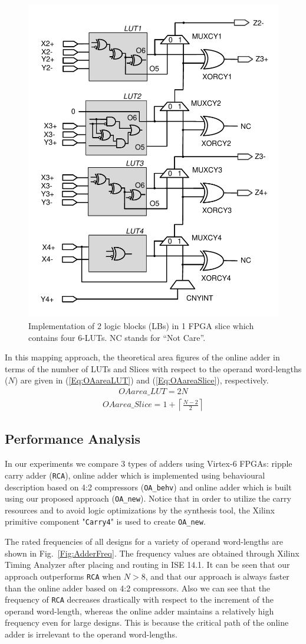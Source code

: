 \documentclass[conference]{IEEEtran}
\begin{document}
\begin{figure}[tbp]
	\centering
	\includegraphics[width=.5\textwidth]{./Figures/SDadder_FastCarry_New.pdf}
	\caption{Implementation of 2 logic blocks (LBs) in 1 FPGA slice which contains four 6-LUTs. NC stands for ``Not Care''.}
	\label{Fig:SliceNew}
\end{figure}

In this mapping approach, the theoretical area figures of the online adder in terms of the number of LUTs and Slices with respect to the operand word-lengths ($N$) are given in (\ref{Eq:OAareaLUT}) and (\ref{Eq:OAareaSlice}), respectively.
\begin{eqnarray}\label{Eq:OAareaLUT}
	OAarea\_LUT = 2N
\end{eqnarray}
%
\begin{eqnarray}\label{Eq:OAareaSlice}
	OAarea\_Slice = 1+\left\lceil\frac{N-2}{2}\right\rceil
\end{eqnarray}

\subsection{Performance Analysis}
In our experiments we compare 3 types of adders using Virtex-6 FPGAs: ripple carry adder (\texttt{RCA}), online adder which is implemented using behavioural description based on 4:2 compressors (\texttt{OA\_behv}) and online adder which is built using our proposed approach (\texttt{OA\_new}). Notice that in order to utilize the carry resources and to avoid logic optimizations by the synthesis tool, the Xilinx primitive component "\texttt{Carry4}" is used to create \texttt{OA\_new}.

The rated frequencies of all designs for a variety of operand word-lengths are shown in Fig.~\ref{Fig:AdderFreq}. The frequency values are obtained through Xilinx Timing Analyzer after placing and routing in ISE 14.1. It can be seen that our approach outperforms \texttt{RCA} when $N>8$, and that our approach is always faster than the online adder based on 4:2 compressors. Also we can see that the frequency of \texttt{RCA} decreases drastically with respect to the increment of the operand word-length, whereas the online adder maintains a relatively high frequency even for large designs. This is because the critical path of the online adder is irrelevant to the operand word-lengths.
\end{document}
